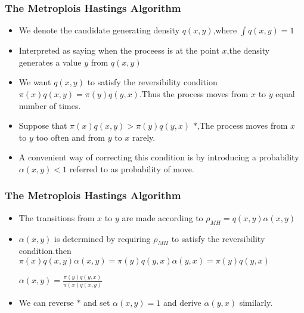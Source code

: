 \documentclass[hyperref={pdfpagelabels=false}]{beamer}
\begin{document}
\begin{frame}
\frametitle{The Metroplois Hastings Algorithm}
\begin{itemize}

\pause
\item We denote the candidate generating density $q(x,y)$,where $\int q(x,y)=1$
\pause
\item Interpreted as saying when the proceess is at the point $x$,the density generates a value $y$ from $q(x,y)$

\pause
\item We want $q(x,y)$ to satisfy the reversibility condition $\pi(x)q(x,y)=\pi(y)q(y,x)$.Thus the process moves from $x$ to $y$ equal number of times.

\pause 
\item Suppose that  $\pi(x)q(x,y)>\pi(y)q(y,x)$ $*$,The process moves from $x$ to $y$ too often and from $y$ to $x$ rarely.

\pause
\item A convenient  way of correcting this condition is by introducing a probability $\alpha(x,y)<1$ referred to as probability of move.
\end{itemize}
\end{frame}

\begin{frame}
\frametitle{The Metroplois Hastings Algorithm}
\begin{itemize}
\pause
\item The transitions from $x$ to $y$ are made according to $\rho_{MH}=q(x,y)\alpha(x,y)$
\pause
\item $\alpha(x,y) $ is determined by requiring $\rho_{MH}$ to satisfy the reversibility condition.then
$\pi(x)q(x,y)\alpha(x,y)=\pi(y)q(y,x)\alpha(y,x)=\pi(y)q(y,x)$

\vspace{5mm}

$\alpha(x,y)=\frac{\pi(y)q(y,x)}{\pi(x)q(x,y)}$

\pause
\item We can reverse  $*$ and set $\alpha(x,y)=1$ and derive $\alpha(y,x)$ similarly.
\end{itemize}
\end{frame}
\end{document}
